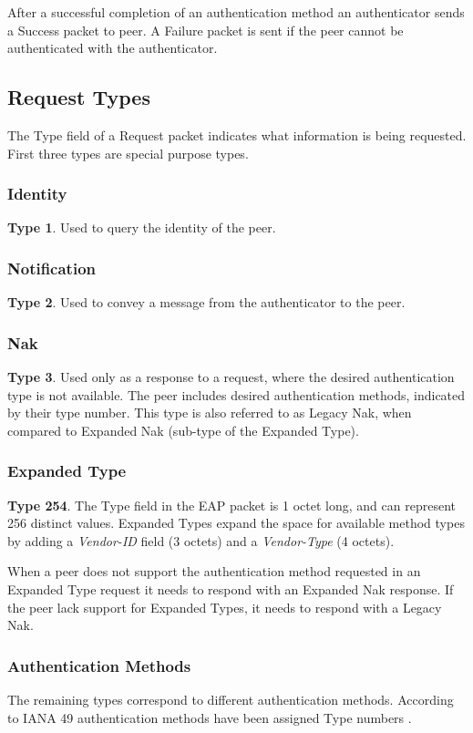 After a successful completion of an authentication method an authenticator sends a Success packet to peer. A Failure packet is sent if the peer cannot be authenticated with the authenticator.


\subsection{Request Types}

The Type field of a Request packet indicates what information is being requested. First three types are special purpose types.

\subsubsection{Identity} \textbf{Type 1}. Used to query the identity of the peer.

\subsubsection{Notification} \textbf{Type 2}. Used to convey a message from the authenticator to the peer.

\subsubsection{Nak} \textbf{Type 3}. Used only as a response to a request, where the desired authentication type is not available.
The peer includes desired authentication methods, indicated by their type number.
This type is also referred to as Legacy Nak, when compared to Expanded Nak (sub-type of the Expanded Type).

\subsubsection{Expanded Type} \textbf{Type 254}. The Type field in the EAP packet is 1 octet long, and can represent 256 distinct values.%
Expanded Types expand the space for available method types by adding a \textit{Vendor-ID} field (3 octets) and a \textit{Vendor-Type} (4 octets).

When a peer does not support the authentication method requested in an Expanded Type request it needs to respond with an Expanded Nak response. 
If the peer lack support for Expanded Types, it needs to respond with a Legacy Nak.

\subsubsection{Authentication Methods}
The remaining types correspond to different authentication methods.
According to IANA 49 authentication methods have been assigned Type numbers \cite{joseph2004eap}.

